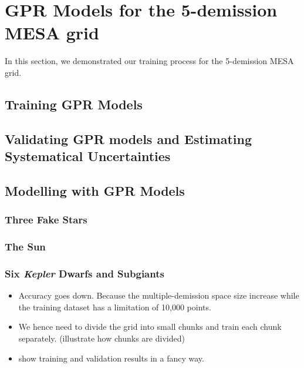 \section{GPR Models for the 5-demission MESA grid}\label{sec:augmentation}
In this section, we demonstrated our training process for the 5-demission \textsc{MESA} grid.

\subsection{Training GPR Models}

\subsection{Validating GPR models and Estimating Systematical Uncertainties}

\subsection{Modelling with GPR Models}

\subsubsection{Three Fake Stars}

\subsubsection{The Sun}

\subsubsection{Six {\em Kepler} Dwarfs and Subgiants}

\begin{itemize}
\item Accuracy goes down. Because the multiple-demission space size increase while the training dataset has a limitation of 10,000 points.  
\item We hence need to divide the grid into small chunks and train each chunk separately.  (illustrate how chunks are divided)
\item  show training and validation results in a fancy way. 
\end{itemize}


